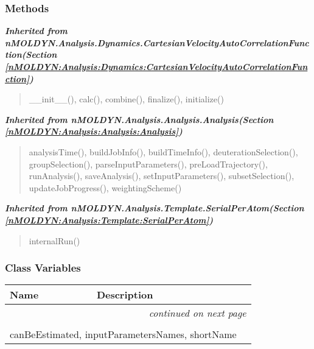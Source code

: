 
  \subsubsection{Methods}


\large{\textbf{\textit{Inherited from nMOLDYN.Analysis.Dynamics.CartesianVelocityAutoCorrelationFunction\textit{(Section \ref{nMOLDYN:Analysis:Dynamics:CartesianVelocityAutoCorrelationFunction})}}}}

\begin{quote}
\_\_init\_\_(), calc(), combine(), finalize(), initialize()
\end{quote}

\large{\textbf{\textit{Inherited from nMOLDYN.Analysis.Analysis.Analysis\textit{(Section \ref{nMOLDYN:Analysis:Analysis:Analysis})}}}}

\begin{quote}
analysisTime(), buildJobInfo(), buildTimeInfo(), deuterationSelection(), groupSelection(), parseInputParameters(), preLoadTrajectory(), runAnalysis(), saveAnalysis(), setInputParameters(), subsetSelection(), updateJobProgress(), weightingScheme()
\end{quote}

\large{\textbf{\textit{Inherited from nMOLDYN.Analysis.Template.SerialPerAtom\textit{(Section \ref{nMOLDYN:Analysis:Template:SerialPerAtom})}}}}

\begin{quote}
internalRun()
\end{quote}


  \subsubsection{Class Variables}

    \vspace{-1cm}
\hspace{\varindent}\begin{longtable}{|p{\varnamewidth}|p{\vardescrwidth}|l}
\cline{1-2}
\cline{1-2} \centering \textbf{Name} & \centering \textbf{Description}& \\
\cline{1-2}
\endhead\cline{1-2}\multicolumn{3}{r}{\small\textit{continued on next page}}\\\endfoot\cline{1-2}
\endlastfoot\multicolumn{2}{|l|}{\textit{Inherited from nMOLDYN.Analysis.Dynamics.CartesianVelocityAutoCorrelationFunction \textit{(Section \ref{nMOLDYN:Analysis:Dynamics:CartesianVelocityAutoCorrelationFunction})}}}\\
\multicolumn{2}{|p{\varwidth}|}{\raggedright canBeEstimated, inputParametersNames, shortName}\\
\cline{1-2}
\end{longtable}

